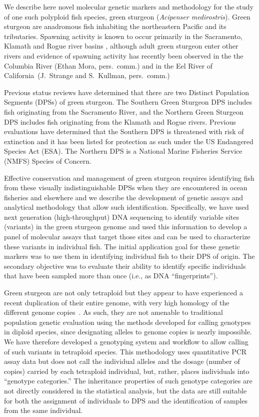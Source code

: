We describe here novel molecular genetic markers and methodology for the study
of 
one such polyploid fish species, green sturgeon ({\em Acipenser medirostris}). Green sturgeon are anadromous fish
inhabiting the northeastern Pacific and its tributaries. Spawning activity is
known to occur primarily in the Sacramento, Klamath and Rogue river basins
\citep{adams2007population}, although adult green sturgeon enter other rivers and evidence of
spawning activity has recently been observed in the the Columbia River (Ethan Mora, pers.\ comm.) and
in the Eel River of California~(J.~Strange and S.~Kullman, pers.\ comm.)

Previous status reviews \citep{adams2007population,nmfs2015sturgeon} have determined that
there are two Distinct Population Segments (DPSs) of green sturgeon. The
Southern Green Sturgeon DPS includes fish originating from the Sacramento River,
and the Northern Green Sturgeon DPS includes fish originating from the Klamath
and Rogue rivers. Previous evaluations \citep{adams2007population,nmfs2015sturgeon} have
determined that the Southern DPS is threatened with risk of extinction and it
has been listed for protection as such under the US Endangered Species Act (ESA). The
Northern DPS is a National Marine Fisheries Service (NMFS) Species of Concern.

Effective conservation and management of green sturgeon requires identifying 
fish from these visually indistinguishable DPSs when they are encountered in 
ocean fisheries and elsewhere and we describe the development of genetic 
assays and analytical methodology that allow such identification. Specifically, 
we have used next generation (high-throughput)
DNA sequencing to identify variable sites (variants) in the green sturgeon
genome and used this information to develop a panel of molecular assays that
target those sites and can be used to characterize these variants in
individual fish. The initial application goal for these genetic markers was to
use them in identifying individual fish to their DPS of origin. The
secondary objective was to evaluate their ability to identify specific
individuals that have been sampled more than once (i.e., as DNA ``fingerprints'').

Green sturgeon are not only tetraploid but they appear to have experienced a 
recent duplication of their entire genome, with very high homology of 
the different genome copies~\citep{Israeletal2009}. As such, they are not amenable to traditional
population genetic evaluation using the methods developed for calling genotypes
in diploid species, since designating alleles to genome 
copies is nearly impossible. 
We have therefore developed a genotyping system and workflow to allow 
calling of such variants in tetraploid species. 
This methodology uses quantitative PCR assay data 
but does not call the individual alleles and the dosage 
(number of copies) carried by each tetraploid individual, but, rather, 
places individuals into ``genotype categories.''  The
inheritance properties of such genotype categories are not directly considered
in the statistical analysis, but the data are still suitable for both the assignment
of individuals to DPS and the identification of samples from the same
individual.

